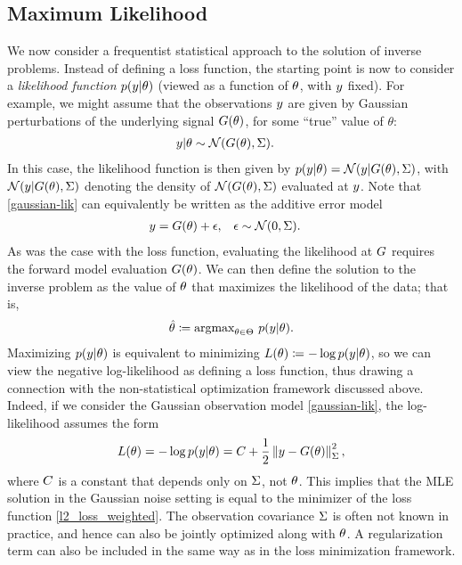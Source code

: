 \documentclass[12pt]{article}
\begin{document}
\subsection{Maximum Likelihood}
We now consider a frequentist statistical approach to the solution of inverse problems. Instead of defining a loss function, the 
starting point is now to consider a \textit{likelihood function} $p(y | \theta)$ (viewed as a function of $\theta$, with $y$ fixed). 
For example, we might assume that the observations $y$ are given by Gaussian perturbations of the underlying signal 
$G(\theta)$, for some ``true'' value of $\theta$: 
\begin{align}
y | \theta &\sim \mathcal{N}(G(\theta), \Sigma). \label{gaussian-lik}
\end{align}
In this case, the likelihood function is then given by $p(y | \theta) = \mathcal{N}(y | G(\theta), \Sigma)$, with 
$\mathcal{N}(y | G(\theta), \Sigma)$ denoting the density of $\mathcal{N}(G(\theta), \Sigma)$ evaluated 
at $y$. Note that \ref{gaussian-lik} can equivalently be written as the additive error model 
\begin{align}
y &= G(\theta) + \epsilon, && \epsilon \sim \mathcal{N}(0, \Sigma). 
\end{align}
As was the case with the loss function, evaluating the likelihood at $G$ requires the forward 
model evaluation $G(\theta)$. We can then define the solution to the inverse problem as the value 
of $\theta$ that maximizes the likelihood of the data; that is, 
\begin{align}
\hat{\theta} \coloneqq \text{argmax}_{\theta \in \Theta} \ p(y | \theta). \label{mle}
\end{align}
Maximizing $p(y | \theta)$ is equivalent to minimizing $L(\theta) \coloneqq -\log p(y | \theta)$, so we can view the 
negative log-likelihood as defining a loss function, thus drawing a connection with the non-statistical optimization 
framework discussed above. Indeed, if we consider the Gaussian observation model \ref{gaussian-lik}, the log-likelihood
assumes the form 
\begin{align}
L(\theta) = -\log p(y | \theta) = C + \frac{1}{2} \left\lVert y - G(\theta)\right\rVert_{\Sigma}^2, 
\end{align}
where $C$ is a constant that depends only on $\Sigma$, not $\theta$. 
This implies that the MLE solution in the Gaussian noise setting is equal to the minimizer of the loss function 
\ref{l2_loss_weighted}. The observation covariance $\Sigma$ is often not known in practice, and hence can 
also be jointly optimized along with $\theta$. A regularization term can also be included in the same way as in the 
loss minimization framework. 
\end{document}
